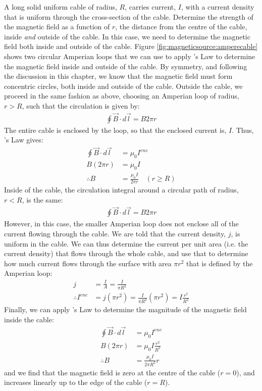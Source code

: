 \begin{example}{A long solid uniform cable of radius, $R$, carries current, $I$, with a current density that is uniform through the cross-section of the cable. Determine the strength of the magnetic field as a function of $r$, the distance from the centre of the cable, inside \textit{and} outside of the cable.}
In this case, we need to determine the magnetic field both inside and outside of the cable. Figure \ref{fig:magneticsource:amperecable} shows two circular Amperian loops that we can use to apply \ampere's Law to determine the magnetic field inside and outside of the cable.
By symmetry, and following the discussion in this chapter, we know that the magnetic field must form concentric circles, both inside and outside of the cable. Outside the cable, we proceed in the same fashion as above, choosing an Amperian loop of radius, $r>R$, such that the circulation is given by:
\begin{align*}
\oint \vec B \cdot d\vec l= B 2\pi r
\end{align*}
The entire cable is enclosed by the loop, so that the enclosed current is, $I$. Thus, \ampere's Law gives:
\begin{align*}
\oint \vec B \cdot d\vec l &=\mu_0 I^{enc}\\
B (2\pi r) &= \mu_0 I\\
\therefore B &= \frac{\mu_0 I}{2\pi r}\quad(r\geq R)
\end{align*} 
Inside of the cable, the circulation integral around a circular path of radius, $r<R$, is the same:
\begin{align*}
\oint \vec B \cdot d\vec l= B 2\pi r
\end{align*}
However, in this case, the smaller Amperian loop does not enclose all of the current flowing through the cable. We are told that the current density, $j$, is uniform in the cable. We can thus determine the current per unit area (i.e. the current density) that flows through the whole cable, and use that to determine how much current flows through the surface with area $\pi r^2$ that is defined by the Amperian loop:
\begin{align*}
j &= \frac{I}{A}=\frac{I}{\pi R^2}\\
\therefore I^{enc} &= j(\pi r^2) = \frac{I}{\pi R^2}(\pi r^2)=I\frac{r^2}{R^2}
\end{align*}
Finally, we can apply \ampere's Law to determine the magnitude of the magnetic field inside the cable:
\begin{align*}
\oint \vec B \cdot d\vec l &=\mu_0 I^{enc}\\
B (2\pi r) &= \mu_0 I\frac{r^2}{R^2}\\
\therefore B &= \frac{\mu_0 I}{2\pi R^2}r
\end{align*}
and we find that the magnetic field is zero at the centre of the cable ($r=0$), and increases linearly up to the edge of the cable ($r=R$).


\end{example}
